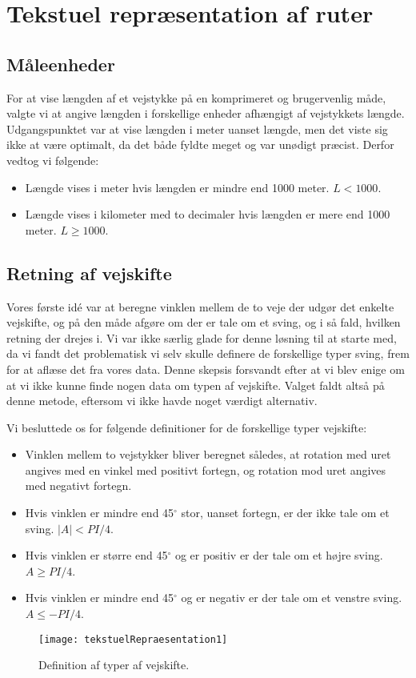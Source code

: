 \section{Tekstuel repræsentation af ruter}
\label{sec:tekstuelRepraesentation}

\subsection{Måleenheder}
\label{sec:maaleenheder}

For at vise længden af et vejstykke på en komprimeret og brugervenlig måde, valgte vi at angive længden i forskellige enheder afhængigt af vejstykkets længde. Udgangspunktet var at vise længden i meter uanset længde, men det viste sig ikke at være optimalt, da det både fyldte meget og var unødigt præcist. Derfor vedtog vi følgende:

\begin{itemize}
	\item Længde vises i meter hvis længden er mindre end 1000 meter. $L < 1000$.
	\item Længde vises i kilometer med to decimaler hvis længden er mere end 1000 meter. $L \geq 1000$.
\end{itemize}

\subsection{Retning af vejskifte}
\label{sec:retning}

Vores første idé var at beregne vinklen mellem de to veje der udgør det enkelte vejskifte, og på den måde afgøre om der er tale om et sving, og i så fald, hvilken retning der drejes i. Vi var ikke særlig glade for denne løsning til at starte med, da vi fandt det problematisk vi selv skulle definere de forskellige typer sving, frem for at aflæse det fra vores data. Denne skepsis forsvandt efter at vi blev enige om at vi ikke kunne finde nogen data om typen af vejskifte. Valget faldt altså på denne metode, eftersom vi ikke havde noget værdigt alternativ.

Vi besluttede os for følgende definitioner for de forskellige typer vejskifte:

\begin{itemize}
	\item Vinklen mellem to vejstykker bliver beregnet således, at rotation med uret angives med en vinkel med positivt fortegn, og rotation mod uret angives med negativt fortegn.
	\item Hvis vinklen er mindre end 45$^{\circ}$ stor, uanset fortegn, er der ikke tale om et sving. $|A| < PI / 4$.
	\item Hvis vinklen er større end 45$^{\circ}$ og er positiv er der tale om et højre sving. $A \geq PI / 4$.
	\item Hvis vinklen er mindre end 45$^{\circ}$ og er negativ er der tale om et venstre sving. $A \leq -PI / 4$.
\end{itemize}

\begin{figure}[h]
	\centering
	\texttt{[image: tekstuelRepraesentation1]}
	\captionsetup{width=0.8\textwidth}
	\caption{Definition af typer af vejskifte.}
	\label{figur:tekstuelRepraesentation1}
\end{figure}